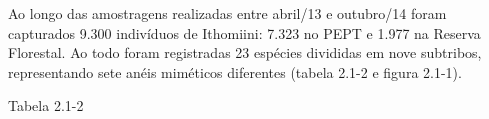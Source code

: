 Ao longo das amostragens realizadas entre abril/13 e outubro/14 foram capturados 9.300 indivíduos de Ithomiini: 7.323 no PEPT e 1.977 na Reserva Florestal. Ao todo foram registradas 23 espécies divididas em nove subtribos, representando sete anéis miméticos diferentes (tabela 2.1-2 e figura 2.1-1). 

Tabela 2.1-2






